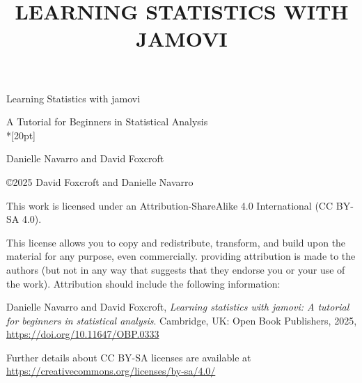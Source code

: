 \documentclass[
  a4paper,
]{book}
\title{LEARNING STATISTICS WITH JAMOVI}
\author{}
\date{}
\let\oldmaketitle\maketitle
\begin{document}
\frontmatter
\maketitle
\begin{center}

\end{center}
\pagestyle{empty}

\let\maketitle\oldmaketitle
\maketitle

\mainmatter
\pagestyle{plain}

\let\footnote=\endnote



\hspace{0pt}
\vfill
\begin{center}

\Huge{Learning Statistics with jamovi}

\Large{A Tutorial for Beginners in Statistical Analysis}\\*[20pt]

\normalsize{Danielle Navarro and David Foxcroft}

\vfill
\end{center}
\hspace{0pt}
\pagebreak

\hspace{0pt}
\vfill

\copyright 2025 David Foxcroft and Danielle Navarro

This work is licensed under an Attribution-ShareAlike 4.0 International (CC BY-SA 4.0).

This license allows you to copy and redistribute, transform, and build upon the material for any purpose, even commercially. providing attribution is made to the authors (but not in any way that suggests that they endorse you or your use of the work). Attribution should include the following information:

Danielle Navarro and David Foxcroft, \textit{Learning statistics with jamovi: A tutorial for beginners in statistical analysis}. Cambridge, UK: Open Book Publishers, 2025, \url{https://doi.org/10.11647/OBP.0333}

Further details about CC BY-SA licenses are available at \\ \url{https://creativecommons.org/licenses/by-sa/4.0/}
\end{document}

